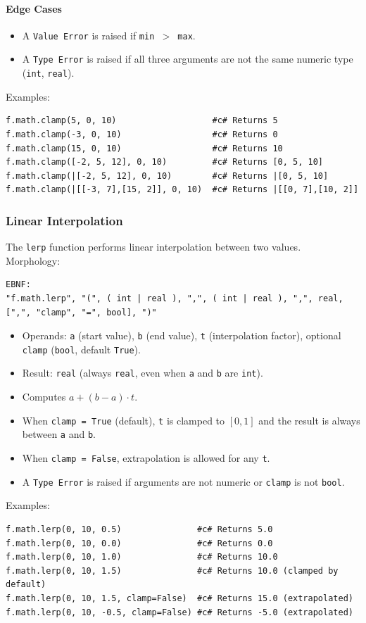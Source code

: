 \paragraph{Edge Cases}
\begin{itemize}
\item A \texttt{Value Error} is raised if \texttt{min $>$ max}.
\item A \texttt{Type Error} is raised if all three arguments are not the same numeric type (\texttt{int}, \texttt{real}).
\end{itemize}
Examples:
\begin{verbatim}
f.math.clamp(5, 0, 10)                   #c# Returns 5
f.math.clamp(-3, 0, 10)                  #c# Returns 0
f.math.clamp(15, 0, 10)                  #c# Returns 10
f.math.clamp([-2, 5, 12], 0, 10)         #c# Returns [0, 5, 10]
f.math.clamp(|[-2, 5, 12], 0, 10)        #c# Returns |[0, 5, 10]
f.math.clamp(|[[-3, 7],[15, 2]], 0, 10)  #c# Returns |[[0, 7],[10, 2]]
\end{verbatim}

\subsubsection{Linear Interpolation}
The \texttt{lerp} function performs linear interpolation between two values. \\
Morphology:
\begin{verbatim}
EBNF:
"f.math.lerp", "(", ( int | real ), ",", ( int | real ), ",", real, [",", "clamp", "=", bool], ")"
\end{verbatim}
\begin{itemize}
\item Operands: \texttt{a} (start value), \texttt{b} (end value), \texttt{t} (interpolation factor), optional \texttt{clamp} (\texttt{bool}, default \texttt{True}).
\item Result: \texttt{real} (always \texttt{real}, even when \texttt{a} and \texttt{b} are \texttt{int}).
\item Computes $a + (b - a) \cdot t$.
\item When \texttt{clamp = True} (default), \texttt{t} is clamped to $[0, 1]$ and the result is always between \texttt{a} and \texttt{b}.
\item When \texttt{clamp = False}, extrapolation is allowed for any \texttt{t}.
\item A \texttt{Type Error} is raised if arguments are not numeric or \texttt{clamp} is not \texttt{bool}.
\end{itemize}
Examples:
\begin{verbatim}
f.math.lerp(0, 10, 0.5)               #c# Returns 5.0
f.math.lerp(0, 10, 0.0)               #c# Returns 0.0
f.math.lerp(0, 10, 1.0)               #c# Returns 10.0
f.math.lerp(0, 10, 1.5)               #c# Returns 10.0 (clamped by default)
f.math.lerp(0, 10, 1.5, clamp=False)  #c# Returns 15.0 (extrapolated)
f.math.lerp(0, 10, -0.5, clamp=False) #c# Returns -5.0 (extrapolated)
\end{verbatim}

